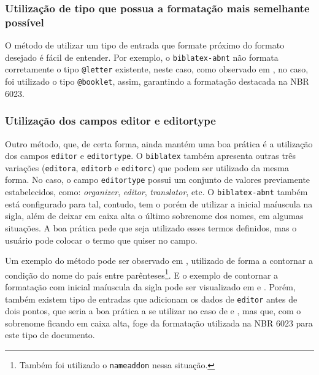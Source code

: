 \subsubsection{Utilização de tipo que possua a formatação mais semelhante possível}
O método de utilizar um tipo de entrada que formate próximo do formato desejado é fácil de entender. Por exemplo, o \texttt{biblatex-abnt} não formata corretamente o tipo \texttt{@letter} existente, neste caso, como observado em \textcite{correspondencia:ex1}, no caso, foi utilizado o tipo \texttt{@booklet}, assim, garantindo a formatação destacada na NBR 6023. 

\subsubsection{Utilização dos campos editor e editortype}
Outro método, que, de certa forma, ainda mantém uma boa prática é a utilização dos campos \texttt{editor} e \texttt{editortype}. O \texttt{biblatex} também apresenta outras três variações (\texttt{editora}, \texttt{editorb} e \texttt{editorc}) que podem ser utilizado da mesma forma. No caso, o campo \texttt{editortype} possui um conjunto de valores previamente estabelecidos, como: \textit{organizer}, \textit{editor}, \textit{translator}, etc. O \texttt{biblatex-abnt} também está configurado para tal, contudo, tem o porém de utilizar a inicial maíuscula na sigla, além de deixar em caixa alta o último sobrenome dos nomes, em algumas situações. A boa prática pede que seja utilizado esses termos definidos, mas o usuário pode colocar o termo que quiser no campo.

Um exemplo do método pode ser observado em \textcite{parte:ex1}, utilizado de forma a contornar a condição do nome do país entre parênteses\footnote{Também foi utilizado o \texttt{nameaddon} nessa situação.}. E o exemplo de contornar a formatação com inicial maíuscula da sigla pode ser visualizado em \textcite{parte:ex2} e \textcite{livro:iffar-guia-normalizacao-2022}. Porém, também existem tipo de entradas que adicionam os dados de \texttt{editor} antes de dois pontos, que seria a boa prática a se utilizar no caso de \textcite{filme:bee-movie} e \textcite{serie:grande-familia}, mas que, com o sobrenome ficando em caixa alta, foge da formatação utilizada na NBR 6023 para este tipo de documento.

